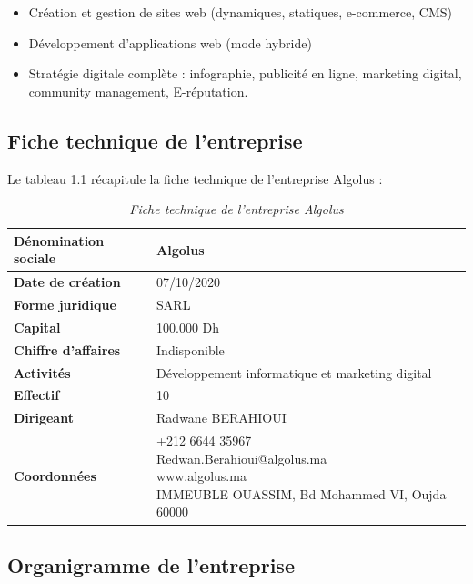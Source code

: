 \documentclass[12pt,a4paper]{report}
\begin{document}
	\renewcommand{\labelitemi}{$\bullet$}
	\begin{itemize}
		\item Création et gestion de sites web (dynamiques, statiques, e-commerce, CMS)
		\item Développement d'applications web (mode hybride)
		\item Stratégie digitale complète : infographie, publicité en ligne, marketing digital, community management, E-réputation.
	\end{itemize}
	
	\subsection{Fiche technique de l'entreprise}
	
	Le tableau 1.1 récapitule la fiche technique de l'entreprise Algolus :
	
	\begin{table}[H]
		\centering
		\caption{\textit{Fiche technique de l'entreprise Algolus}}
		\begin{tabular}{|l|l|}
			\hline
			\textbf{Dénomination sociale} & Algolus \\
			\hline
			\textbf{Date de création} & 07/10/2020 \\
			\hline
			\textbf{Forme juridique} & SARL \\
			\hline
			\textbf{Capital} & 100.000 Dh \\
			\hline
			\textbf{Chiffre d'affaires} & Indisponible \\
			\hline
			\textbf{Activités} & Développement informatique et marketing digital \\
			\hline
			\textbf{Effectif} & 10 \\
			\hline
			\textbf{Dirigeant} & Radwane BERAHIOUI \\
			\hline
			\textbf{Coordonnées} & \makecell[l]{+212 6644 35967 \\ Redwan.Berahioui@algolus.ma \\ www.algolus.ma \\ IMMEUBLE OUASSIM, Bd Mohammed VI, Oujda 60000} \\
			\hline
		\end{tabular}
		\label{tab:fiche-technique-algolus}  %
	\end{table}
	
	\subsection{Organigramme de l’entreprise}
	
\end{document}
